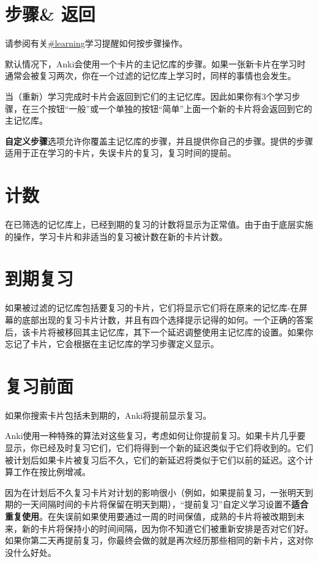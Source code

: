 \documentclass[a4paper]{book}
\begin{document}
			\section{步骤\& 返回}
			请参阅有关\url{#learning}学习提醒如何按步骤操作。
			
			默认情况下，Anki会使用一个卡片的主记忆库的步骤。如果一张新卡片在学习时通常会被复习两次，你在一个过滤的记忆库上学习时，同样的事情也会发生。
			
			当（重新）学习完成时卡片会返回到它们的主记忆库。因此如果你有3个学习步骤，在三个按钮“一般”或一个单独的按钮“简单”上面一个新的卡片将会返回到它的主记忆库。
			
			\textbf{自定义步骤}选项允许你覆盖主记忆库的步骤，并且提供你自己的步骤。提供的步骤适用于正在学习的卡片，失误卡片的复习，复习时间的提前。
			
			\section{计数}
			
			在已筛选的记忆库上，已经到期的复习的计数将显示为正常值。由于由于底层实施的操作，学习卡片和非适当的复习被计数在新的卡片计数。
			
			\section{到期复习}
			
			如果被过滤的记忆库包括要复习的卡片，它们将显示它们将在原来的记忆库-在屏幕的底部出现的复习卡片计数，并且有四个选择提示记得的如何。一个正确的答案后，该卡片将被移回其主记忆库，其下一个延迟调整使用主记忆库的设置。如果你忘记了卡片，它会根据在主记忆库的学习步骤定义显示。
			
			\section{复习前面}
			
			如果你搜索卡片包括未到期的，Anki将提前显示复习。
			
			Anki使用一种特殊的算法对这些复习，考虑如何让你提前复习。如果卡片几乎要显示，你已经及时复习它们，它们将得到一个新的延迟类似于它们将收到的。它们被计划后如果卡片被复习后不久，它们的新延迟将类似于它们以前的延迟。这个计算工作在按比例增减。
			
			
			\begin{shaded}
				因为在计划后不久复习卡片对计划的影响很小（例如，如果提前复习，一张明天到期的一天间隔时间的卡片将保留在明天到期），“提前复习”自定义学习设置不\textbf{适合重复使用}。在失误前如果使用要通过一周的时间保值，成熟的卡片将被改期到未来，新的卡片将保持小的时间间隔，因为你不知道它们被重新安排是否对它们好。如果你第二天再提前复习，你最终会做的就是再次经历那些相同的新卡片，这对你没什么好处。
			\end{shaded}
			
\end{document}
